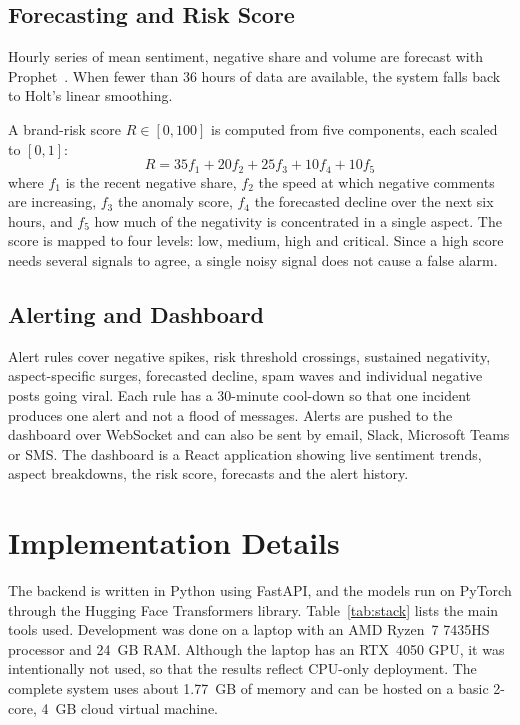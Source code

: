 \documentclass[conference]{IEEEtran}
\begin{document}
\subsection{Forecasting and Risk Score}
Hourly series of mean sentiment, negative share and volume are forecast with Prophet~\cite{b8}. When
fewer than 36 hours of data are available, the system falls back to Holt's linear smoothing.

A brand-risk score $R \in [0, 100]$ is computed from five components, each scaled to $[0,1]$:
\begin{equation}
R = 35 f_1 + 20 f_2 + 25 f_3 + 10 f_4 + 10 f_5
\end{equation}
where $f_1$ is the recent negative share, $f_2$ the speed at which negative comments are increasing,
$f_3$ the anomaly score, $f_4$ the forecasted decline over the next six hours, and $f_5$ how much of
the negativity is concentrated in a single aspect. The score is mapped to four levels: low, medium,
high and critical. Since a high score needs several signals to agree, a single noisy signal does not
cause a false alarm.

\subsection{Alerting and Dashboard}
Alert rules cover negative spikes, risk threshold crossings, sustained negativity, aspect-specific
surges, forecasted decline, spam waves and individual negative posts going viral. Each rule has a
30-minute cool-down so that one incident produces one alert and not a flood of messages. Alerts are
pushed to the dashboard over WebSocket and can also be sent by email, Slack, Microsoft Teams or SMS.
The dashboard is a React application showing live sentiment trends, aspect breakdowns, the risk
score, forecasts and the alert history.

\section{Implementation Details}

The backend is written in Python using FastAPI, and the models run on PyTorch through the Hugging Face
Transformers library. Table~\ref{tab:stack} lists the main tools used. Development was done on a
laptop with an AMD Ryzen~7 7435HS processor and 24~GB RAM. Although the laptop has an RTX~4050 GPU,
it was intentionally not used, so that the results reflect CPU-only deployment. The complete system
uses about 1.77~GB of memory and can be hosted on a basic 2-core, 4~GB cloud virtual machine.
\end{document}

